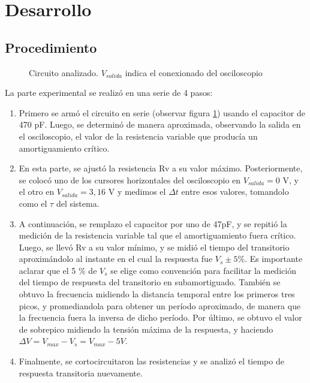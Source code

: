\documentclass{article}
\begin{document}
\section{Desarrollo}
    \subsection{Procedimiento}

\begin{figure}[H]
    \centering
    \caption{Circuito analizado. $V_{salida}$ indica el conexionado del osciloscopio}
    \label{fig: circuito_rlc}
\end{figure}


    La parte experimental se realizó en una serie de 4 pasos:

    \begin{enumerate}
        \item Primero se armó el circuito en serie (observar figura \ref{fig: circuito_rlc}) usando el capacitor de 470 pF. Luego, se determinó de manera aproximada, observando la salida en el osciloscopio, el valor de la resistencia variable que producía un amortiguamiento crítico.
        \item En esta parte, se ajustó la resistencia Rv a su valor máximo. Posteriormente, se colocó uno de los cursores horizontales del osciloscopio en $ V_{salida}=0$ V, y el otro en $ V_{salida}=3,16$ V y medimos el $ \Delta t $ entre esos valores, tomandolo como el $\tau$ del sistema.
        \item A continuación, se remplazo el capacitor por uno de 47pF, y se repitió la medición de la resistencia variable tal que el amortiguamiento fuera crítico. Luego, se llevó Rv a su valor mínimo, y se midió el tiempo del transitorio aproximándolo al instante en el cual la respuesta fue $V_s \pm 5\% $. Es importante aclarar que el 5 \% de $V_s$ se elige como convención para facilitar la medición del tiempo de respuesta del transitorio en subamortiguado. También se obtuvo la frecuencia midiendo la distancia temporal entre los primeros tres picos, y promediandola para obtener un período aproximado, de manera que la frecuencia fuera la inversa de dicho período. Por último, se obtuvo el valor de sobrepico midiendo la tensión máxima de la respuesta, y haciendo $ \Delta V = V_{max} - V_s = V_{max} - 5 V $.
        \item Finalmente, se cortocircuitaron las resistencias y se analizó el tiempo de respuesta transitoria nuevamente.
        
    \end{enumerate}
\end{document}
